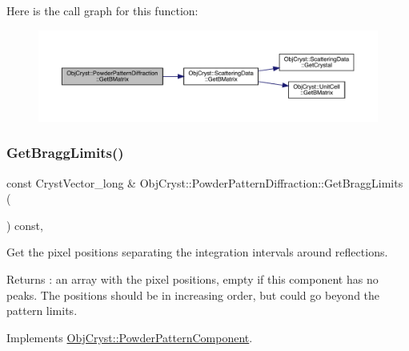 Here is the call graph for this function\+:
\nopagebreak
\begin{figure}[H]
\begin{center}
\leavevmode
\includegraphics[width=350pt]{class_obj_cryst_1_1_powder_pattern_diffraction_ac2079a53e2f3655ea04aa79474dfb970_cgraph}
\end{center}
\end{figure}
\mbox{\label{class_obj_cryst_1_1_powder_pattern_diffraction_a9d2ea6f73a2a65a3d5eec0bc892a976f}} 
\subsubsection{\texorpdfstring{GetBraggLimits()}{GetBraggLimits()}}
{\footnotesize\ttfamily const Cryst\+Vector\+\_\+long \& Obj\+Cryst\+::\+Powder\+Pattern\+Diffraction\+::\+Get\+Bragg\+Limits (\begin{DoxyParamCaption}{ }\end{DoxyParamCaption}) const\hspace{0.3cm}{\ttfamily [protected]}, {\ttfamily [virtual]}}

Get the pixel positions separating the integration intervals around reflections.

\begin{DoxyReturn}{Returns}
\+: an array with the pixel positions, empty if this component has no peaks. The positions should be in increasing order, but could go beyond the pattern limits. 
\end{DoxyReturn}


Implements \mbox{\hyperlink{class_obj_cryst_1_1_powder_pattern_component_a727488f859528b0a9b5da47973804e01}{Obj\+Cryst\+::\+Powder\+Pattern\+Component}}.

\mbox{\label{class_obj_cryst_1_1_powder_pattern_diffraction_a87785bf69fbd81df78c47f3d42efaf4e}} 
